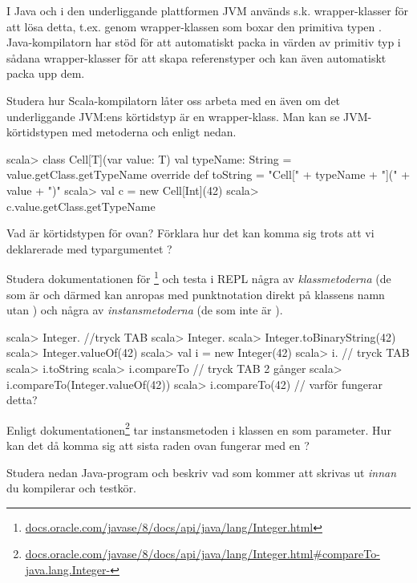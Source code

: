 I Java och i den underliggande plattformen JVM används s.k. wrapper-klasser för att lösa detta, t.ex. genom wrapper-klassen  som boxar den primitiva typen . Java-kompilatorn har stöd för att automatiskt packa in värden av primitiv typ i sådana wrapper-klasser för att skapa referenstyper och kan även automatiskt packa upp dem. 

\Subtask Studera hur Scala-kompilatorn låter oss arbeta med en  även om det underliggande JVM:ens körtidstyp  är en wrapper-klass. Man kan se JVM-körtidstypen med metoderna  och  enligt nedan.
\begin{REPL}
scala> class Cell[T](var value: T){
         val typeName: String = value.getClass.getTypeName
         override def toString = "Cell[" + typeName + "](" + value + ")"
       }
scala> val c = new Cell[Int](42)
scala> c.value.getClass.getTypeName
\end{REPL}


\Subtask Vad är körtidstypen för  ovan? Förklara hur det kan komma sig trots att vi deklarerade med typargumentet ? 

\Subtask Studera dokumentationen för \footnote{\href{https://docs.oracle.com/javase/8/docs/api/java/lang/Integer.html}{docs.oracle.com/javase/8/docs/api/java/lang/Integer.html}} och testa i REPL några av \emph{klassmetoderna} (de som är  och därmed kan anropas med punktnotation direkt på klassens namn utan ) och några av \emph{instansmetoderna} (de som inte är ). 
\begin{REPL}
scala> Integer.  //tryck TAB
scala> Integer.
scala> Integer.toBinaryString(42)
scala> Integer.valueOf(42)
scala> val i = new Integer(42)
scala> i.  // tryck TAB
scala> i.toString
scala> i.compareTo  // tryck TAB 2 gånger
scala> i.compareTo(Integer.valueOf(42))
scala> i.compareTo(42)  // varför fungerar detta?      
\end{REPL} 

\Subtask\Pen Enligt dokumentationen\footnote{\href{https://docs.oracle.com/javase/8/docs/api/java/lang/Integer.html\#compareTo-java.lang.Integer-}{docs.oracle.com/javase/8/docs/api/java/lang/Integer.html\#compareTo-java.lang.Integer-}} tar instansmetoden  i klassen  en  som parameter. Hur kan det då komma sig att sista raden ovan fungerar med en ?

\Subtask Studera nedan Java-program och beskriv vad som kommer att skrivas ut \emph{innan} du kompilerar och testkör.

